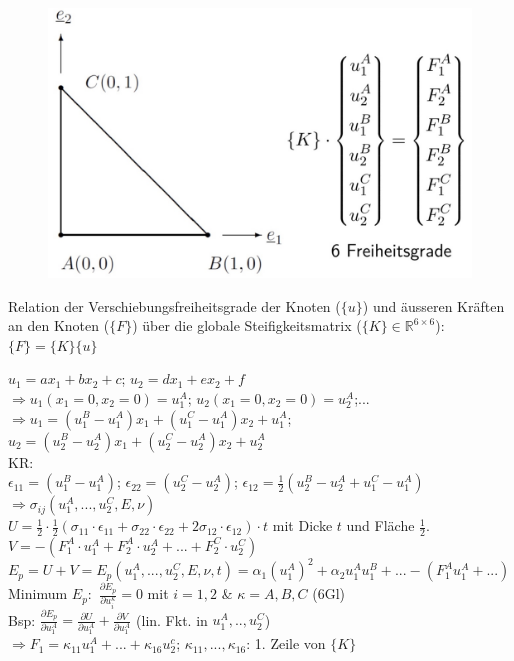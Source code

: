 \documentclass[a4paper,10pt]{article}
\begin{document}
\begin{multicols*}{3}
            \vspace{-2mm}
            \begin{figure}
                \vspace{-5mm}
                \includegraphics[width=\linewidth]{Dreieckselement}
            \end{figure}
            Relation der Verschiebungsfreiheitsgrade der Knoten ($\{u\}$) und äusseren Kräften an den Knoten ($\{F\}$) über die globale Steifigkeitsmatrix ($\{K\}\in\mathbb{R}^{6\times6}$): $\{F\}=\{K\}\{u\}$
            \columnbreak
            
            $u_1=ax_1+bx_2+c$; $u_2=dx_1+ex_2+f$\\
            $\Rightarrow u_1(x_1=0,x_2=0)=u_1^A$; $u_2(x_1=0,x_2=0)=u_2^A$;...\\
            $\Rightarrow u_1=(u_1^B-u_1^A)x_1+(u_1^C-u_1^A)x_2+u_1^A$;\\
            $u_2=(u_2^B-u_2^A)x_1+(u_2^C-u_2^A)x_2+u_2^A$\\
            KR:\\
            $\epsilon_{11}=(u_1^B-u_1^A)$; $\epsilon_{22}=(u_2^C-u_2^A)$; $\epsilon_{12}=\frac{1}{2}(u_2^B-u_2^A+u_1^C-u_1^A)$
            $\Rightarrow\sigma_{ij}(u_1^A,...,u_2^C,E,\nu)$\\
            $U=\frac{1}{2}\cdot\frac{1}{2}(\sigma_{11}\cdot\epsilon_{11}+\sigma_{22}\cdot\epsilon_{22}+2\sigma_{12}\cdot\epsilon_{12})\cdot t$ mit Dicke $t$ und Fläche $\frac{1}{2}$.\\
            $V=-(F_1^A\cdot u_1^A+F_2^A\cdot u_2^A+...+F_2^C\cdot u_2^C)$\\
            $E_p=U+V=E_p(u_1^A,...,u_2^C,E,\nu,t)=\alpha_1(u_1^A)^2+\alpha_2u_1^Au_1^B+ ...-(F_1^Au_1^A+...)$\\
            Minimum $E_p:$ $\frac{\partial E_p}{\partial u_i^\kappa}=0$ mit $i=1,2$ \& $\kappa=A,B,C$ (6Gl)\\
            Bsp: $\frac{\partial E_p}{\partial u_1^A}=\frac{\partial U}{\partial u_1^A}+\frac{\partial V}{\partial u_1^A}$ (lin. Fkt. in $u_1^A,..,u_2^C$) \\$\Rightarrow F_1=\kappa_{11}u_1^A+...+\kappa_{16}u_2^c$; $\kappa_{11},...,\kappa_{16}$: 1. Zeile von $\{K\}$


\end{multicols*}
\end{document}
